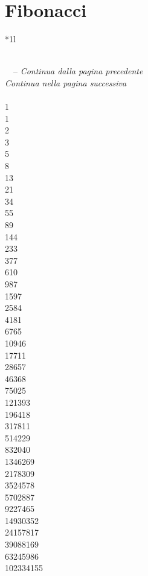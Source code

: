 \chapter{Fibonacci}
\begin{longtable}{*{1}{l}}\toprule
\caption{Numeri di Fibonacci}\\
\midrule
\endfirsthead
{} {\tablename\ \thetable\ -- \textit{Continua dalla pagina precedente}} \\
\toprule
\endhead
\bottomrule
{} {\textit{Continua nella pagina successiva}} \\
\endfoot
{}\\
1\\
1\\
2\\
3\\
5\\
8\\
13\\
21\\
34\\
55\\
89\\
144\\
233\\
377\\
610\\
987\\
1597\\
2584\\
4181\\
6765\\
10946\\
17711\\
28657\\
46368\\
75025\\
121393\\
196418\\
317811\\
514229\\
832040\\
1346269\\
2178309\\
3524578\\
5702887\\
9227465\\
14930352\\
24157817\\
39088169\\
63245986\\
102334155\\

\end{longtable}
